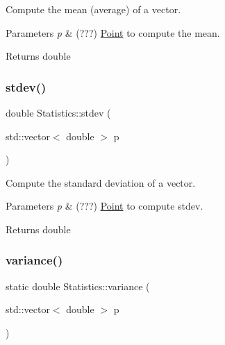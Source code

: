 Compute the mean (average) of a vector. 


\begin{DoxyParams}{Parameters}
{\em p} & (???) \hyperlink{class_point}{Point} to compute the mean. \\
\hline
\end{DoxyParams}
\begin{DoxyReturn}{Returns}
double 
\end{DoxyReturn}
\mbox{\label{class_statistics_a75435245095cd0fd54b2d57a6ae592da}} 
\subsubsection{\texorpdfstring{stdev()}{stdev()}}
{\footnotesize\ttfamily double Statistics\+::stdev (\begin{DoxyParamCaption}\item[{std\+::vector$<$ double $>$}]{p }\end{DoxyParamCaption})\hspace{0.3cm}{\ttfamily [static]}}



Compute the standard deviation of a vector. 


\begin{DoxyParams}{Parameters}
{\em p} & (???) \hyperlink{class_point}{Point} to compute stdev. \\
\hline
\end{DoxyParams}
\begin{DoxyReturn}{Returns}
double 
\end{DoxyReturn}
\mbox{\label{class_statistics_af3a74e0ab944341356b8afeb9fc0ecbd}} 
\subsubsection{\texorpdfstring{variance()}{variance()}\hspace{0.1cm}{\footnotesize\ttfamily [1/2]}}
{\footnotesize\ttfamily static double Statistics\+::variance (\begin{DoxyParamCaption}\item[{std\+::vector$<$ double $>$}]{p }\end{DoxyParamCaption})\hspace{0.3cm}{\ttfamily [static]}}



